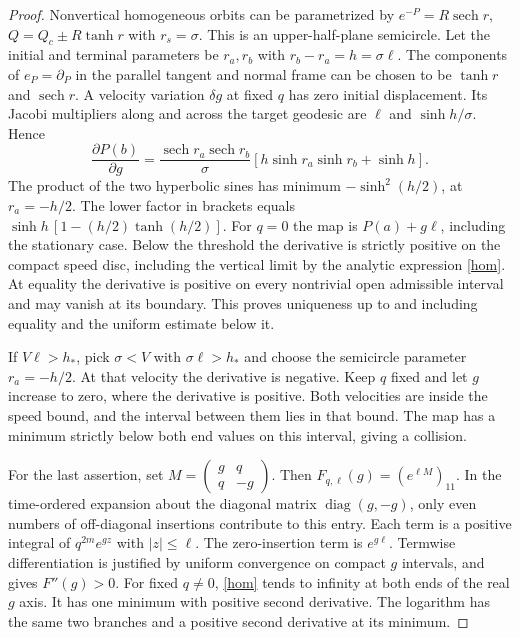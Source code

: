 \documentclass[11pt]{article}
\newcommand{\sech}{\operatorname{sech}}
\begin{document}
\begin{proof}
Nonvertical homogeneous orbits can be parametrized by
$e^{-P}=R\sech r$, $Q=Q_c\pm R\tanh r$ with $r_s=\sigma$.
This is an upper-half-plane semicircle.
Let the initial and terminal parameters be $r_a,r_b$ with
$r_b-r_a=h=\sigma\ell$. The components of $e_P=\partial_P$
in the parallel tangent and normal frame can be chosen to be
$\tanh r$ and $\sech r$.
A velocity variation $\delta g$ at fixed $q$ has zero initial
displacement. Its Jacobi multipliers along and across the target
geodesic are $\ell$ and $\sinh h/\sigma$. Hence
\[
 \frac{\partial P(b)}{\partial g}
 = \frac{\sech r_a\sech r_b}{\sigma}
    \left[h\sinh r_a\sinh r_b+\sinh h\right].
\]
The product of the two hyperbolic sines has minimum
$-\sinh^2(h/2)$, at $r_a=-h/2$. The lower factor in brackets
equals $\sinh h\,[1-(h/2)\tanh(h/2)]$.
For $q=0$ the map is $P(a)+g\ell$, including the stationary case.
Below the threshold the derivative is strictly positive on the
compact speed disc, including the vertical limit by the analytic
expression \eqref{hom}. At equality the derivative is positive
on every nontrivial open admissible interval and may vanish at
its boundary. This proves uniqueness up to and including equality
and the uniform estimate below it.

If $V\ell>h_*$, pick $\sigma<V$ with $\sigma\ell>h_*$ and
choose the semicircle parameter $r_a=-h/2$.
At that velocity the derivative is negative.
Keep $q$ fixed and let $g$ increase to zero, where the derivative
is positive. Both velocities are inside the speed bound, and the
interval between them lies in that bound. The map has a minimum
strictly below both end values on this interval, giving a collision.

For the last assertion, set
$M=\left(\begin{smallmatrix}g&q\\q&-g\end{smallmatrix}\right)$.
Then $F_{q,\ell}(g)=(e^{\ell M})_{11}$.
In the time-ordered expansion about the diagonal matrix
$\operatorname{diag}(g,-g)$, only even numbers of off-diagonal
insertions contribute to this entry. Each term is a positive
integral of $q^{2m}e^{g z}$ with $|z|\le\ell$.
The zero-insertion term is $e^{g\ell}$.
Termwise differentiation is justified by uniform convergence
on compact $g$ intervals, and gives $F''(g)>0$.
For fixed $q\ne0$, \eqref{hom} tends to infinity at both ends
of the real $g$ axis. It has one minimum with positive
second derivative. The logarithm has the same two branches
and a positive second derivative at its minimum.
\end{proof}
\end{document}
